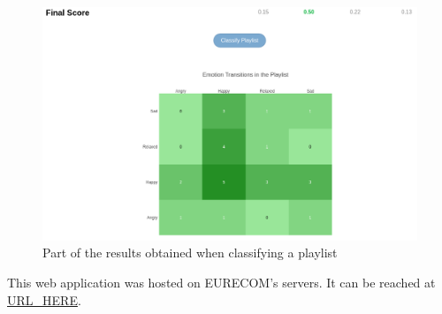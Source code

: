 \begin{figure}
  \centering
  \includegraphics[width=1.0\textwidth]{./chapters/appendix1/images/demo-final-result}
  \caption{Part of the results obtained when classifying a playlist}
  \label{fig:demo-final-result}
\end{figure}

This web application was hosted on EURECOM's servers. It can be reached at \url{URL_HERE}.